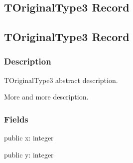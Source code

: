 \documentclass{report}
\newif\ifpdf
\begin{document}
\subsection*{\large{\textbf{TOriginalType3 Record}}\normalsize\hspace{1ex}\hrulefill}
\else
\subsection*{TOriginalType3 Record}
\fi
\label{ok_type_aliases.TOriginalType3}
\subsubsection*{\large{\textbf{Description}}\normalsize\hspace{1ex}\hfill}
TOriginalType3 abstract description.\hfill\vspace*{1ex}

 More and more description.\subsubsection*{\large{\textbf{Fields}}\normalsize\hspace{1ex}\hfill}
\begin{list}{}{
\setlength{\itemindent}{0cm}
\setlength{\listparindent}{0cm}
\setlength{\leftmargin}{\evensidemargin}
\addtolength{\leftmargin}{\tmplength}
\settowidth{\labelsep}{X}
\addtolength{\leftmargin}{\labelsep}
\setlength{\labelwidth}{\tmplength}
}
\label{ok_type_aliases.TOriginalType3-x}
\item[\textbf{x}\hfill]
\ifpdf
\begin{flushleft}
\fi
\begin{ttfamily}
public x: integer \end{ttfamily}

\ifpdf
\end{flushleft}
\fi


\par  \label{ok_type_aliases.TOriginalType3-y}
\item[\textbf{y}\hfill]
\ifpdf
\begin{flushleft}
\fi
\begin{ttfamily}
public y: integer \end{ttfamily}

\ifpdf
\end{flushleft}
\fi


\par  \end{list}
\ifpdf
\end{document}
